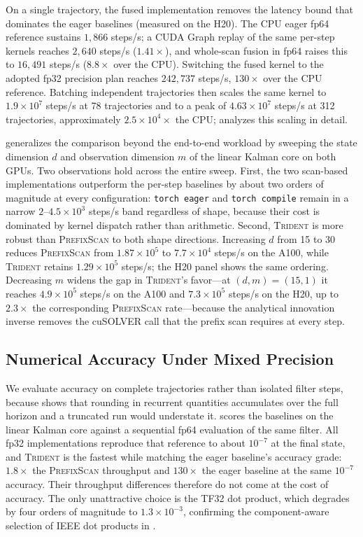 On a single trajectory, the fused implementation removes the latency bound that dominates the eager baselines (measured on the H20). The CPU eager fp64 reference sustains $1{,}866$ steps/s; a CUDA Graph replay of the same per-step kernels reaches $2{,}640$ steps/s ($1.41\times$), and whole-scan fusion in fp64 raises this to $16{,}491$ steps/s ($8.8\times$ over the CPU). Switching the fused kernel to the adopted fp32 precision plan reaches $242{,}737$ steps/s, $130\times$ over the CPU reference. Batching independent trajectories then scales the same kernel to $1.9\times10^{7}$ steps/s at 78 trajectories and to a peak of $4.63\times10^{7}$ steps/s at 312 trajectories, approximately $2.5\times10^{4}\times$ the CPU;  analyzes this scaling in detail.

 generalizes the comparison beyond the end-to-end workload by sweeping the state dimension $d$ and observation dimension $m$ of the linear Kalman core on both GPUs. Two observations hold across the entire sweep. First, the two scan-based implementations outperform the per-step baselines by about two orders of magnitude at every configuration: \texttt{torch eager} and \texttt{torch compile} remain in a narrow $2$--$4.5\times10^{3}$ steps/s band regardless of shape, because their cost is dominated by kernel dispatch rather than arithmetic. Second, \textsc{Trident} is more robust than \textsc{PrefixScan} to both shape directions. Increasing $d$ from 15 to 30 reduces \textsc{PrefixScan} from $1.87\times10^{5}$ to $7.7\times10^{4}$ steps/s on the A100, while \textsc{Trident} retains $1.29\times10^{5}$ steps/s; the H20 panel shows the same ordering. Decreasing $m$ widens the gap in \textsc{Trident}'s favor---at $(d,m)=(15,1)$ it reaches $4.9\times10^{5}$ steps/s on the A100 and $7.3\times10^{5}$ steps/s on the H20, up to $2.3\times$ the corresponding \textsc{PrefixScan} rate---because the analytical innovation inverse removes the cuSOLVER call that the prefix scan requires at every step.

\subsection{Numerical Accuracy Under Mixed Precision}
\label{subsec:precision-evaluation}

We evaluate accuracy on complete trajectories rather than isolated filter steps, because  shows that rounding in recurrent quantities accumulates over the full horizon and a truncated run would understate it.  scores the baselines on the linear Kalman core against a sequential fp64 evaluation of the same filter. All fp32 implementations reproduce that reference to about $10^{-7}$ at the final state, and \textsc{Trident} is the fastest while matching the eager baseline's accuracy grade: $1.8\times$ the \textsc{PrefixScan} throughput and $130\times$ the eager baseline at the same $10^{-7}$ accuracy. Their throughput differences therefore do not come at the cost of accuracy. The only unattractive choice is the TF32 dot product, which degrades by four orders of magnitude to $1.3\times10^{-3}$, confirming the component-aware selection of IEEE dot products in .


